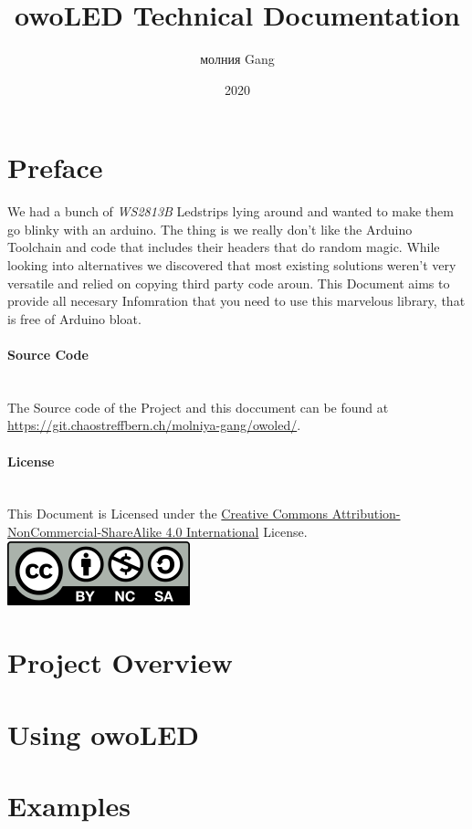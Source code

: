 \documentclass[12pt]{article}
\title{owoLED Technical Documentation}
\date{2020}
\author{молния Gang}
\newcommand{\betterParagraph}[1]{\paragraph{#1}\mbox{}\\}
\begin{document}


\tableofcontents

\newpage

\section*{Preface}
We had a bunch of \textit{WS2813B} Led\-strips lying around and wanted to make them go blinky with an arduino.
The thing is we really don't like the Arduino Toolchain and code that includes their headers that do random magic.
While looking into alternatives we discovered that most existing solutions weren't very versatile and relied on  copying third party code aroun.
\bigbreak
This Document aims to provide all necesary Infomration that you need to use this marvelous library, that is free of Arduino bloat. 

\betterParagraph{Source Code}
The Source code of the Project and this doccument can be found at \url{https://git.chaostreffbern.ch/molniya-gang/owoled/}.

\betterParagraph{License}
This Document is Licensed under the \href{https://creativecommons.org/licenses/by-nc-sa/4.0/}{Creative Commons Attribution-NonCommercial-ShareAlike 4.0 International} License.
\bigbreak
\includegraphics{cc-by-nc-sa_icon.png}
\bigbreak


\newpage
\section{Project Overview}

\newpage
\section{Using owoLED}

\newpage
\section{Examples}

\newpage

\end{document}
